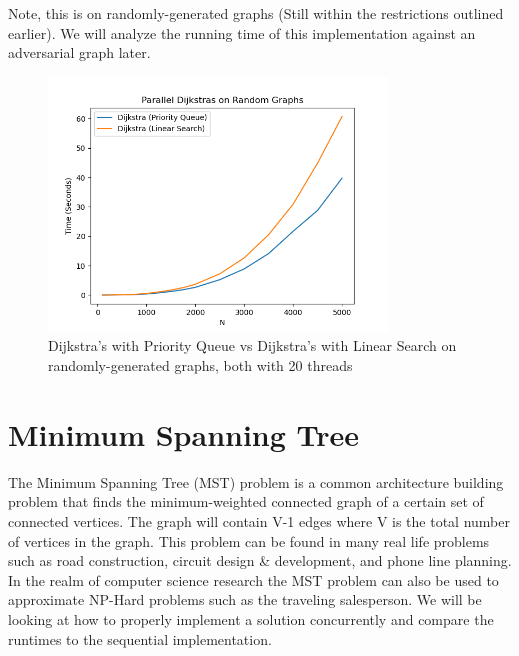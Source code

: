 \documentclass[conference]{IEEEtran}
\begin{document}
Note, this is on randomly-generated graphs (Still within the restrictions outlined earlier). We will analyze the running time of this implementation against an adversarial graph later. 

\break
\break

\begin{figure}[t]
    
\end{figure}



\begin{figure}[t]
    \centering
    \includegraphics[width=9cm]{images/benchdijkstra.png}
    \caption{Dijkstra's with Priority Queue vs Dijkstra's with Linear Search on randomly-generated graphs, both with 20 threads}
    \label{fig:dijkstra_both}
\end{figure}

\break
\newpage

\section{Minimum Spanning Tree}
The Minimum Spanning Tree (MST) problem is a common architecture building problem that finds the minimum-weighted connected graph of a certain set of connected vertices. The graph will contain V-1 edges where V is the total number of vertices in the graph. This problem can be found in many real life problems such as road construction, circuit design & development, and phone line planning. In the realm of computer science research the MST problem can also be used to approximate NP-Hard problems such as the traveling salesperson. We will be looking at how to properly implement a solution concurrently and compare the runtimes to the sequential implementation.
\end{document}
